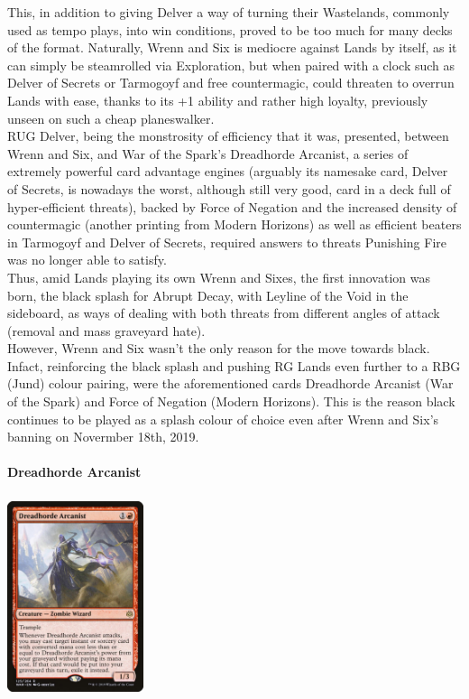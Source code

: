 \documentclass{report}
\begin{document}
This, in addition to giving Delver a way of turning their Wastelands, commonly used as tempo plays, into win conditions, proved to be too much for many decks of the format. Naturally, Wrenn and Six is mediocre against Lands by itself, as it can simply be steamrolled via Exploration, but when paired with a clock such as Delver of Secrets or Tarmogoyf and free countermagic, could threaten to overrun Lands with ease, thanks to its +1 ability and rather high loyalty, previously unseen on such a cheap planeswalker.\\
RUG Delver, being the monstrosity of efficiency that it was, presented, between Wrenn and Six, and War of the Spark's Dreadhorde Arcanist, a series of extremely powerful card advantage engines (arguably its namesake card, Delver of Secrets, is nowadays the worst, although still very good, card in a deck full of hyper-efficient threats), backed by Force of Negation and the increased density of countermagic (another printing from Modern Horizons) as well as efficient beaters in Tarmogoyf and Delver of Secrets, required answers to threats Punishing Fire was no longer able to satisfy.\\
Thus, amid Lands playing its own Wrenn and Sixes, the first innovation was born, the black splash for Abrupt Decay, with Leyline of the Void in the sideboard, as ways of dealing with both threats from different angles of attack (removal and mass graveyard hate).\\
However, Wrenn and Six wasn't the only reason for the move towards black. Infact, reinforcing the black splash and pushing RG Lands even further to a RBG (Jund) colour pairing, were the aforementioned cards Dreadhorde Arcanist (War of the Spark) and Force of Negation (Modern Horizons). This is the reason black continues to be played as a splash colour of choice even after Wrenn and Six's banning on Novermber 18th, 2019.\\\\
\newpage
\textbf{Dreadhorde Arcanist\\}
\begin{center}
\includegraphics [width = 4cm, height = 6cm] {dreadhorde-arcanist}
\end{center}
\end{document}
